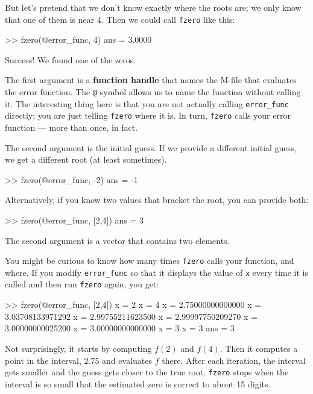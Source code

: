 \documentclass[
]{book}
\numberwithin{Answer}{chapter}
\numberwithin{Exercise}{chapter}
\begin{document}
But let's pretend that we don't know exactly where
the roots are; we only know that one of them is near 4.  Then
we could call {\tt fzero} like this:

\begin{code}
>> fzero(@error_func, 4)
ans = 3.0000
\end{code}

Success!  We found one of the zeros.

The first argument is a
{\bf function handle} that names the M-file that evaluates
the error function.  The {\tt @} symbol allows us to name the
function without calling it.  The interesting thing here is
that you are not actually calling {\tt error\_func} directly;
you are just telling {\tt fzero} where it is.  In turn, {\tt fzero}
calls your error function --- more than once, in fact.


The second argument is the initial guess.  If we provide a different
initial guess, we get a different root (at least sometimes).

\begin{code}
>> fzero(@error_func, -2)
ans = -1
\end{code}

Alternatively, if you know two values that bracket the root,
you can provide both:

\begin{code}
>> fzero(@error_func, [2,4])
ans = 3
\end{code}

The second argument is a vector that contains two elements.  

You might be curious to know how many times {\tt fzero} calls your
function, and where.  If you modify {\tt error\_func} so that it displays
the value of {\tt x} every time it is called and then run {\tt fzero}
again, you get:

\begin{code}
>> fzero(@error_func, [2,4])
x = 2
x = 4
x = 2.75000000000000
x = 3.03708133971292
x = 2.99755211623500
x = 2.99997750209270
x = 3.00000000025200
x = 3.00000000000000
x = 3
x = 3
ans = 3
\end{code}

Not surprisingly, it starts by computing $f(2)$ and $f(4)$.  Then it computes a point in the interval, $2.75$ and evaluates $f$ there.  After each iteration, the interval gets smaller and the guess gets closer to the true root.
{\tt fzero} stops when the interval is so small that the estimated
zero is correct to about 15 digits.
 
\end{document}
